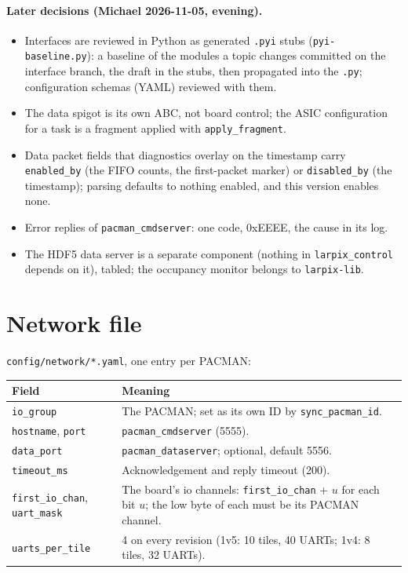 \documentclass[11pt]{article}
\newcommand{\h}[1]{\texttt{#1}}
\begin{document}
\paragraph{Later decisions (Michael 2026-11-05, evening).}
\begin{itemize}
\item Interfaces are reviewed in Python as generated \h{.pyi} stubs (\h{pyi-baseline.py}):  a baseline of the
  modules a topic changes committed on the interface branch, the draft in the stubs, then propagated into the
  \h{.py};  configuration schemas (YAML) reviewed with them.
\item The data spigot is its own ABC, not board control;  the ASIC configuration for a task is a fragment applied
  with \h{apply\_fragment}.
\item Data packet fields that diagnostics overlay on the timestamp carry \h{enabled\_by} (the FIFO counts, the
  first-packet marker) or \h{disabled\_by} (the timestamp);  parsing defaults to nothing enabled, and this version
  enables none.
\item Error replies of \h{pacman\_cmdserver}:  one code, 0xEEEE, the cause in its log.
\item The HDF5 data server is a separate component (nothing in \h{larpix\_control} depends on it), tabled;  the
  occupancy monitor belongs to \h{larpix-lib}.
\end{itemize}

\section{Network file}

\h{config/network/*.yaml}, one entry per PACMAN:

\begin{center}
\small
\begin{tabularx}{\linewidth}{@{}lL@{}}
\toprule
Field & Meaning \\
\midrule
\h{io\_group} & The PACMAN;  set as its own ID by \h{sync\_pacman\_id}. \\
\h{hostname}, \h{port} & \h{pacman\_cmdserver} (5555). \\
\h{data\_port} & \h{pacman\_dataserver};  optional, default 5556. \\
\h{timeout\_ms} & Acknowledgement and reply timeout (200). \\
\h{first\_io\_chan}, \h{uart\_mask} & The board's io channels:  \h{first\_io\_chan} + $u$ for each bit $u$;  the
  low byte of each must be its PACMAN channel. \\
\h{uarts\_per\_tile} & 4 on every revision (1v5:  10 tiles, 40 UARTs;  1v4:  8 tiles, 32 UARTs). \\
\bottomrule
\end{tabularx}
\end{center}
\end{document}
